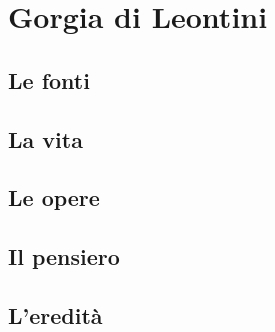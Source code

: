 \chapter{Gorgia di Leontini}

\section{Le fonti}

\section{La vita}

\section{Le opere}

\section{Il pensiero}

\section{L'eredità}
